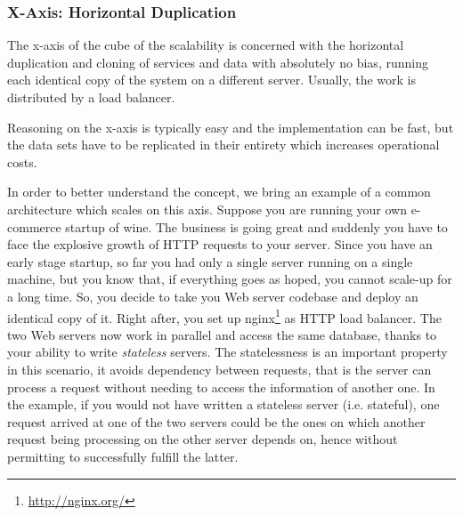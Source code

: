 \subsubsection{X-Axis: Horizontal Duplication}

The x-axis of the cube of the scalability is concerned with the horizontal
duplication and cloning of services and data with absolutely no bias, running
each identical copy of the system on a different server. Usually, the work is
distributed by a load balancer.

Reasoning on the x-axis is typically easy and the implementation can be fast,
but the data sets have to be replicated in their entirety which increases
operational costs.

In order to better understand the concept, we bring an example of a common
architecture which scales on this axis. Suppose you are running your own
e-commerce startup of wine. The business is going great and suddenly you have to
face the explosive growth of HTTP requests to your server. Since you have an
early stage startup, so far you had only a single server running on a single
machine, but you know that, if everything goes as hoped, you cannot scale-up for
a long time. So, you decide to take you Web server codebase and deploy an
identical copy of it. Right after, you set up
nginx\footnote{\url{http://nginx.org/}} as HTTP load balancer. The two Web
servers now work in parallel and access the same database, thanks to your
ability to write \emph{stateless} servers. The statelessness is an important
property in this scenario, it avoids dependency between requests, that is the
server can process a request without needing to access the information of
another one. In the example, if you would not have written a stateless server
(i.e. stateful), one request arrived at one of the two servers could be the ones
on which another request being processing on the other server depends on, hence
without permitting to successfully fulfill the latter.

